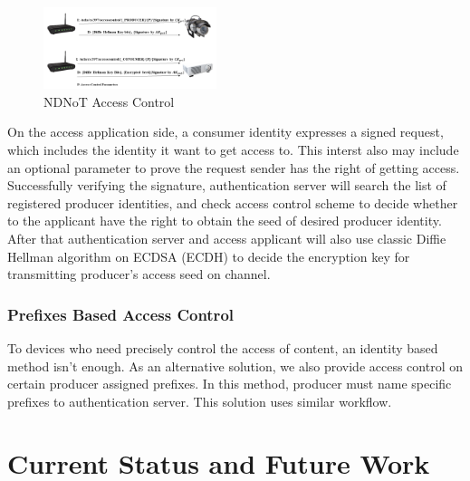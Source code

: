 \documentclass[sigconf]{acmart}
\begin{document}
\begin{figure}[h]
	\vspace{-0.1cm}
	\centering
	\includegraphics[width=0.45\textwidth]{figures/access-control}
	\caption{NDNoT Access Control}
	\vspace{-0.1cm}
	\label{fig:Access-Control}
\end{figure}

On the access application side, a consumer identity expresses a signed request, which includes the identity it want to get access to. This interst also may include an optional parameter to prove the request sender has the right of getting access. 
Successfully verifying the signature, authentication server will search the list of registered producer identities, and check access control scheme to decide whether to the applicant have the right to obtain the seed of desired producer identity. 
After that authentication server and access applicant will also use classic Diffie Hellman algorithm on ECDSA (ECDH) to decide the encryption key for transmitting producer's access seed on channel.

\subsubsection{Prefixes Based Access Control}
To devices who need precisely control the access of content, an identity based method isn't enough. As an alternative solution, we also provide access control on certain producer assigned prefixes. In this method, producer must name specific prefixes 
to authentication server. This solution uses similar workflow. 

\section{Current Status and Future Work}
\end{document}
